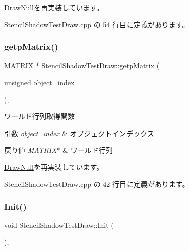 \mbox{\hyperlink{class_draw_null_a0c1efe55fea325ad277594be6fe1e938}{Draw\+Null}}を再実装しています。



 Stencil\+Shadow\+Test\+Draw.\+cpp の 54 行目に定義があります。

\mbox{\label{class_stencil_shadow_test_draw_a8ab105b75d673adc52698a8401c6525c}} 
\subsubsection{\texorpdfstring{getp\+Matrix()}{getpMatrix()}}
{\footnotesize\ttfamily \mbox{\hyperlink{_matrix_8h_a032295cd9fb1b711757c90667278e744}{M\+A\+T\+R\+IX}} $\ast$ Stencil\+Shadow\+Test\+Draw\+::getp\+Matrix (\begin{DoxyParamCaption}\item[{unsigned}]{object\+\_\+index }\end{DoxyParamCaption})\hspace{0.3cm}{\ttfamily [override]}, {\ttfamily [virtual]}}



ワールド行列取得関数 


\begin{DoxyParams}{引数}
{\em object\+\_\+index} & オブジェクトインデックス \\
\hline
\end{DoxyParams}

\begin{DoxyRetVals}{戻り値}
{\em M\+A\+T\+R\+I\+X$\ast$} & ワールド行列 \\
\hline
\end{DoxyRetVals}


\mbox{\hyperlink{class_draw_null_a9aac059eb3b5d1f77e8bd3aa0647cff9}{Draw\+Null}}を再実装しています。



 Stencil\+Shadow\+Test\+Draw.\+cpp の 42 行目に定義があります。

\mbox{\label{class_stencil_shadow_test_draw_a65be72e71cd12cacf315b0364c12c3e3}} 
\subsubsection{\texorpdfstring{Init()}{Init()}}
{\footnotesize\ttfamily void Stencil\+Shadow\+Test\+Draw\+::\+Init (\begin{DoxyParamCaption}{ }\end{DoxyParamCaption})\hspace{0.3cm}{\ttfamily [override]}, {\ttfamily [virtual]}}



